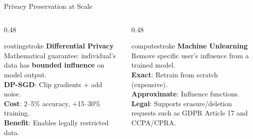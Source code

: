 \documentclass[aspectratio=169, 12pt]{beamer}
\begin{document}
\begin{frame}{Privacy Preservation at Scale}
\footnotesize
\begin{columns}[T]
  \begin{column}{0.48\textwidth}
    \begin{mlsyscard}{routingstroke}
    \textbf{Differential Privacy}\\[0.05cm]
    {\scriptsize
    Mathematical guarantee: individual's data has \textbf{bounded influence} on model output.\\[0.05cm]
    \textbf{DP-SGD}: Clip gradients + add noise.\\[0.05cm]
    \textbf{Cost}: 2--5\% accuracy, +15--30\% training.\\[0.05cm]
    \textbf{Benefit}: Enables legally restricted data.}
    \end{mlsyscard}
  \end{column}
  \begin{column}{0.48\textwidth}
    \begin{mlsyscard}{computestroke}
    \textbf{Machine Unlearning}\\[0.05cm]
    {\scriptsize
    Remove specific user's influence from a trained model.\\[0.05cm]
    \textbf{Exact}: Retrain from scratch (expensive).\\[0.05cm]
    \textbf{Approximate}: Influence functions.\\[0.05cm]
    \textbf{Legal}: Supports erasure/deletion requests such as GDPR Article 17 and CCPA/CPRA.}
    \end{mlsyscard}
  \end{column}
\end{columns}

\vspace{0.05cm}

\end{frame}
\end{document}
